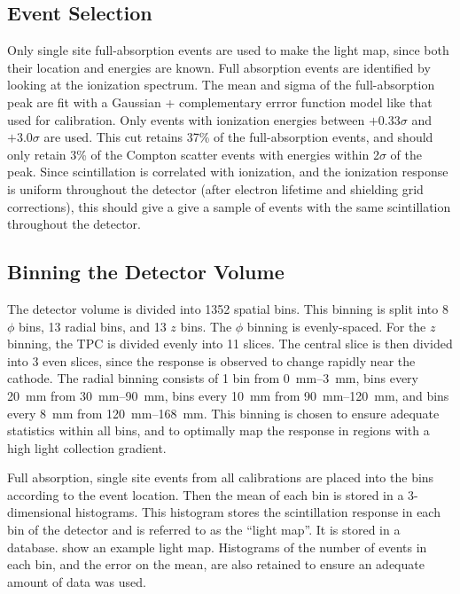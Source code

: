 \documentclass[herrin-thesis.tex]{subfiles}
\begin{document}
\subsection{Event Selection}
Only single site full-absorption events are used to make the light map, since both their location and energies are known. Full absorption events are identified by looking at the ionization spectrum. The mean and sigma of the full-absorption peak are fit with a Gaussian + complementary errror function model like that used for calibration. Only events with ionization energies between \(+0.33\sigma\) and \(+3.0\sigma\) are used. This cut retains 37\% of the full-absorption events, and should only retain 3\% of the Compton scatter events with energies within 2\(\sigma\) of the peak. Since scintillation is correlated with ionization, and the ionization response is uniform throughout the detector (after electron lifetime and shielding grid corrections), this should give a give a sample of events with the same scintillation throughout the detector.

\subsection{Binning the Detector Volume}

The detector volume is divided into 1352 spatial bins. This binning is split into 8 \(\phi\) bins, 13 radial bins, and 13 \(z\) bins. The \(\phi\) binning is evenly-spaced. For the \(z\) binning, the TPC is divided evenly into 11 slices. The central slice is then divided into 3 even slices, since the response is observed to change rapidly near the cathode. The radial binning consists of 1 bin from \SIrange{0}{3}{\mm}, bins every \SI{20}{mm} from \SIrange{30}{90}{\mm}, bins every \SI{10}{\mm} from \SIrange{90}{120}{\mm}, and bins every \SI{8}{mm} from \SIrange{120}{168}{\mm}. This binning is chosen to ensure adequate statistics within all bins, and to optimally map the response in regions with a high light collection gradient.

Full absorption, single site events from all calibrations are placed into the bins according to the event location. Then the mean of each bin is stored in a 3-dimensional histograms. This histogram stores the scintillation response in each bin of the detector and is referred to as the ``light map''. It is stored in a database.  show an example light map. Histograms of the number of events in each bin, and the error on the mean, are also retained to ensure an adequate amount of data was used.
\end{document}
